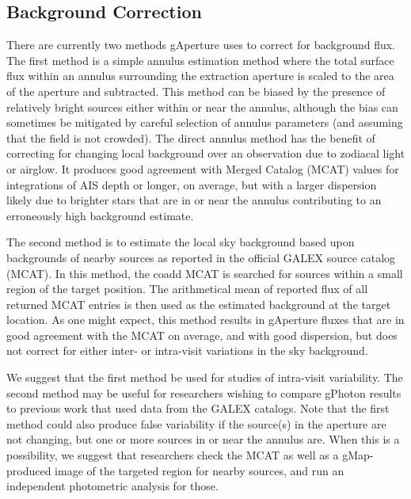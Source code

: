 \documentclass[5p]{elsarticle}
\begin{document}
\subsection{Background Correction}
There are currently two methods gAperture uses to correct for background flux.  The first method is a simple annulus estimation method where the total surface flux within an annulus surrounding the extraction aperture is scaled to the area of the aperture and subtracted. This method can be biased by the presence of relatively bright sources either within or near the annulus, although the bias can sometimes be mitigated by careful selection of annulus parameters (and assuming that the field is not crowded). The direct annulus method has the benefit of correcting for changing local background over an observation due to zodiacal light or airglow. It produces good agreement with Merged Catalog (MCAT) values for integrations of AIS depth or longer, on average, but with a larger dispersion likely due to brighter stars that are in or near the annulus contributing to an erroneously high background estimate.

The second method is to estimate the local sky background based upon backgrounds of nearby sources as reported in the official GALEX source catalog (MCAT). In this method, the coadd MCAT is searched for sources within a small region of the target position. The arithmetical mean of reported flux of all returned MCAT entries is then used as the estimated background at the target location. As one might expect, this method results in gAperture fluxes that are in good agreement with the MCAT on average, and with good dispersion, but does not correct for either inter- or intra-visit variations in the sky background.

We suggest that the first method be used for studies of intra-visit variability. The second method may be useful for researchers wishing to compare gPhoton results to previous work that used data from the GALEX catalogs. Note that the first method could also produce false variability if the source(s) in the aperture are not changing, but one or more sources in or near the annulus are.  When this is a possibility, we suggest that researchers check the MCAT as well as a gMap-produced image of the targeted region for nearby sources, and run an independent photometric analysis for those.
\end{document}
